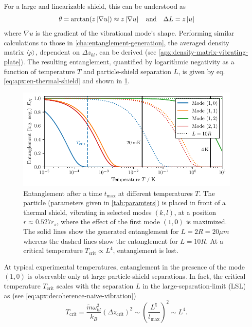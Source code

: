 For a large and linearizable shield, this can be understood as
\begin{equation}
  \theta = \arctan(z \left\lvert\nabla u\right\rvert) \approx z \left\lvert\nabla u\right\rvert \quad \text{and} \quad \Delta L = z \left\lvert u\right\rvert
\end{equation}
where $\nabla u$ is the gradient of the vibrational mode's shape.
Performing similar calculations to those in \cref{cha:entanglement-generation}, the averaged density matrix $\left\langle\rho\right\rangle$, dependent on $\Delta z_{kl}$, can be derived (see \cref{apx:density-matrix-vibrating-plate}).
The resulting entanglement, quantified by logarithmic negativity as a function of temperature $T$ and particle-shield separation $L$, is given by eq. \eqref{eq:apx:en-thermal-shield} and shown in \cref{fig:5:entanglement-temperature}.
\begin{figure}[!htbp]
  \centering
  \includegraphics[width=\textwidth]{./../figures/vibrations/log-neg-shield-vibrations-T.pdf}
  \caption{Entanglement after a time $t_\mathrm{max}$ at different temperatures $T$. The particle (parameters given in \cref{tab:paramters}) is placed in front of a thermal shield, vibrating in selected modes $(k,l)$, at a position $r \approx 0.527 r_s$, where the effect of the first mode $(1,0)$ is maximized. The solid lines show the generated entanglement for $L=2R=20\si{\mu m}$ whereas the dashed lines show the entanglement for $L=10R$. At a critical temperature $T_\mathrm{crit} \propto L^4$, entanglement is lost.}
  \label{fig:5:entanglement-temperature}
\end{figure}
At typical experimental temperatures, entanglement in the presence of the mode $(1,0)$ is observable only at large particle-shield separations.
In fact, the critical temperature $T_\mathrm{crit}$ scales with the separation $L$ in the large-separation-limit (LSL) as (see \cref{eq:apx:decoherence-naive-vibration})
\begin{equation}
  T_\mathrm{crit} = \frac{\tilde{m} \omega^2_{kl}}{k_B}(\Delta z_\mathrm{crit})^2 \sim \left(\frac{L^5}{t_\mathrm{max}} \right)^2 \sim L^4 .
\end{equation}
